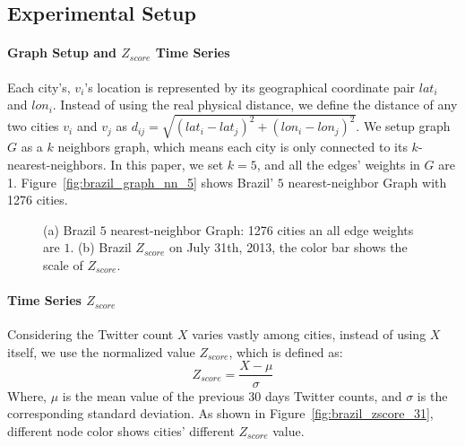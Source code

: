 \documentclass[conference]{IEEEtran}
\begin{document}
\subsection{Experimental Setup}
\label{sec:experimental_setup}

\paragraph{Graph Setup and $Z_{score}$ Time Series}
Each city's, $v_i$'s  location is represented by its geographical coordinate pair $lat_i$ and $lon_i$. Instead of using the real physical distance, we  define the distance of any two cities $v_i$ and $v_j$ as $d_{ij}=\sqrt{(lat_i-lat_j)^2+(lon_i-lon_j)^2}$. We setup graph $G$ as a $k$ neighbors graph, which means  each city is only  connected to its $k$-nearest-neighbors. In this paper, we set $k=5$, and all the edges' weights  in $G$ are 1. Figure~\ref{fig:brazil_graph_nn_5} shows Brazil' $5$ nearest-neighbor Graph with 1276 cities.

\begin{figure}[th]
	\centering
	\caption{(a) Brazil $5$ nearest-neighbor Graph: 1276 cities an all edge weights are $1$. (b) Brazil $Z_{score}$ on July 31th, 2013, the color bar shows the scale of $Z_{score}$.}
	\label{fig:graphwaveletcoefficient}
\end{figure}



\paragraph{Time Series $Z_{score}$}
Considering the Twitter count $X$ varies vastly among cities,  instead of using $X$ itself, we use the normalized value $Z_{score}$, which is defined as:
\begin{equation}
\label{eq:Z_score}
Z_{score}= \frac{X-\mu}{\sigma}
\end{equation}Where, $\mu$ is the mean value of the previous $30$ days Twitter counts, and $\sigma$ is the corresponding standard deviation. As shown in Figure~\ref{fig:brazil_zscore_31}, different node color shows cities' different $Z_{score}$ value.
\end{document}
